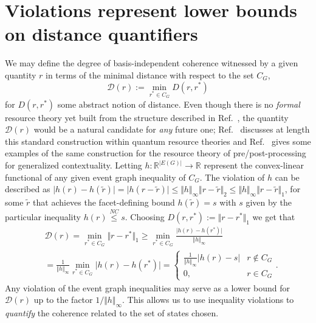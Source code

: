 \documentclass[letterpaper,onecolumn,12pt,accepted=2024-01-17]{article}
\begin{document}
\onecolumn
\appendix

\section{Violations represent lower bounds on distance quantifiers}\label{appendix: rigorous violations analysis}



We may define the degree of basis-independent coherence witnessed by a given quantity $r$ in terms of the minimal distance with respect to the set $C_G$,
\begin{equation}
    \mathcal{D}(r) := \min_{r^* \in C_G} D(r,r^*)
\end{equation}
for $D(r,r^*)$ some abstract notion of distance. Even though there is no \textit{formal} resource theory yet built from the structure described in Ref.~\cite{wagner2022inequalities}, the quantity $\mathcal{D}(r)$ would be a natural candidate for \textit{any} future one; Ref.~\cite[section VI, B]{Chitambar19} discusses at length this standard construction within quantum resource theories and Ref.~\cite{Duarte18} gives some examples of the same construction for the resource theory of pre/post-processing for generalized contextuality. Letting $h: \mathbb{R}^{|E(G)|} \to \mathbb{R}$ represent the convex-linear functional of any given event graph inequality of $C_G$. The violation of $h$ can be described as $\vert h(r) - h(\tilde{r})\vert = \vert h(r-\tilde{r})\vert \leq \Vert h\Vert_\infty \Vert r-\tilde{r} \Vert_2 \leq \Vert h\Vert_\infty \Vert r-\tilde{r} \Vert_1$, for some $\tilde{r}$ that achieves the facet-defining bound $h(\tilde{r}) = s$ with $s$ given by the particular inequality $h(r)\stackrel{NC}{\leq}s$. Choosing $D(r,r^*) := \Vert r-r^*\Vert_1$ we get that
\begin{align*}
    &\mathcal{D}(r) = \min_{r^* \in C_G} \Vert r-r^*\Vert_1 \geq \min_{r^* \in C_G}\frac{\vert h(r) - h(r^*)\vert }{\Vert h \Vert_\infty} \\
    &= \frac{1}{\Vert h \Vert_\infty}\min_{r^* \in C_G}\vert h(r) - h(r^*)\vert = \left\{\begin{matrix}\frac{1}{\Vert h \Vert_\infty}\vert h(r)-s\vert & r \notin C_G \\ 0, & r \in C_G\end{matrix}\right..
\end{align*}
Any violation of the event graph inequalities may serve as a lower bound for $\mathcal{D}(r)$ up to the factor $1/\Vert h \Vert_\infty$. This allows us to use inequality violations to \textit{quantify} the coherence related to the set of states chosen. 
\end{document}
